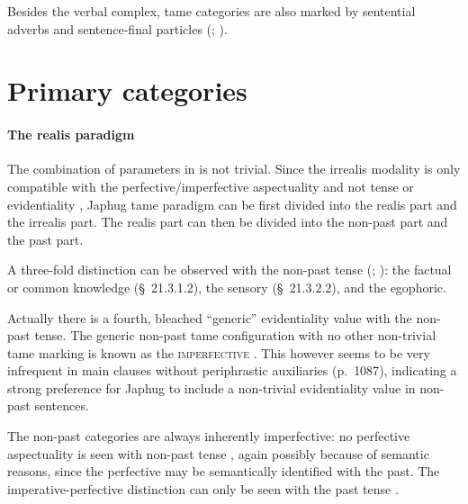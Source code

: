 \documentclass[a4paper, oneside, 12pt]{report}
\newcommand*{\citesec}[1]{\S~{#1}}
\newcommand*{\citetable}[1]{Table~{#1}}
\newcommand*{\citepage}[1]{p.~{#1}}
\newcommand*{\citepages}[1]{pp.~{#1}}
\newcommand{\category}[1]{\textsc{#1}}
\begin{document}
Besides the verbal complex, \acs{tame} categories are also marked by 
sentential adverbs and sentence-final particles 
(\citealt[\citepage{518}]{jacques2019egophoric}; \citealt[\citesec{21.8}]{jacques2021grammar}).


\section{Primary categories}
\label{sec:tame.primary}

\paragraph*{The realis paradigm}
The combination of parameters in  is not trivial.
Since the irrealis modality is only compatible with the perfective/imperfective aspectuality
and not tense or evidentiality
\citep[\citepage{1119}]{jacques2021grammar},
Japhug \ac{tame} paradigm can be first divided into the realis part and the irrealis part.
The realis part can then be divided into the non-past part and the past part.

A three-fold distinction can be observed with the non-past tense
(\citealt[\citesec{21.3.4}]{jacques2021grammar}; 
\citealt[\citepage{517}]{jacques2019egophoric}): 
the factual or common knowledge (\citesec{21.3.1.2}), 
the sensory (\citesec{21.3.2.2}),
and the egophoric.

Actually there is a fourth, bleached ``generic'' evidentiality value 
with the non-past tense.
The generic non-past \acs{tame} configuration 
with no other non-trivial \acs{tame} marking 
is known as the \category{imperfective} \citep[\citesec{21.2}]{jacques2021grammar}.
This however seems to be very infrequent in main clauses
without periphrastic auxiliaries (\citepage{1087}),
indicating a strong preference for Japhug 
to include a non-trivial evidentiality value in non-past sentences.

The non-past categories are always inherently imperfective:
no perfective aspectuality is seen with non-past tense 
\citep[\citepage{517}]{jacques2019egophoric},
again possibly because of semantic reasons,
since the perfective may be semantically identified with the past.
The imperative-perfective distinction can only be seen 
with the past tense \citep[\citetable{21.1}, note that the \category{aorist} is also known as 
the \category{past perfective}; \citepages{1135, 1143}]{jacques2021grammar}.
\end{document}
